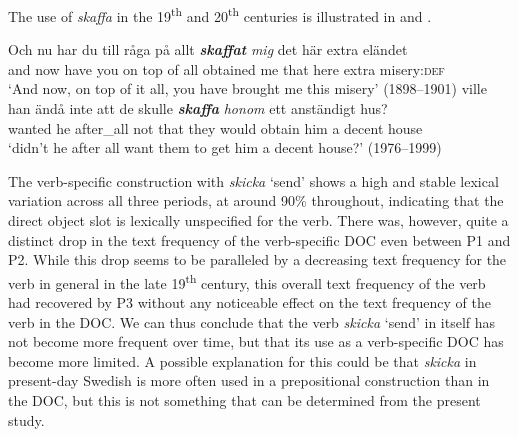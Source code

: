 \documentclass[output=paper]{langscibook}
\begin{document}
\begin{table}
\caption{Frequency measures of the verb-specific DOC with \textit{skaffa} ‘obtain’}
\label{tab:valdeson:18}
\end{table}

The use of \textit{skaffa} in the 19\textsuperscript{th} and 20\textsuperscript{th} centuries is illustrated in  and .


\ea \label{ex:valdeson:28}
\gll Och   nu   har   du   till     råga   på   allt \textbf{\textit{skaffat}} \textit{mig} det     här   extra eländet\\
  and     now have   you on   top   of       all   obtained   me  that    here    extra   misery:\textsc{def}\\
\glt `And now, on top of it all, you have brought me this misery’ (1898–1901)
\ex \label{ex:valdeson:29}
\gll ville     han ändå     inte    att    de   skulle \textbf{\textit{skaffa}} \textit{honom} ett   anständigt   hus?\\
  wanted   he   after\_all not     that   they   would   obtain   him a   decent           house\\
\glt `didn’t he after all want them to get him a decent house?’ (1976–1999)
\z


\label{sec:valdeson:5.3.3.6}



The verb-specific construction with \textit{skicka} ‘send’ shows a high and stable lexical variation across all three periods, at around 90\% throughout, indicating that the direct object slot is lexically unspecified for the verb. There was, however, quite a distinct drop in the text frequency of the verb-specific DOC even between P1 and P2. While this drop seems to be paralleled by a decreasing text frequency for the verb in general in the late 19\textsuperscript{th} century, this overall text frequency of the verb had recovered by P3 without any noticeable effect on the text frequency of the verb in the DOC. We can thus conclude that the verb \textit{skicka} ‘send’ in itself has not become more frequent over time, but that its use as a verb-specific DOC has become more limited. A possible explanation for this could be that \textit{skicka} in present-day Swedish is more often used in a prepositional construction than in the DOC, but this is not something that can be determined from the present study.
\end{document}
